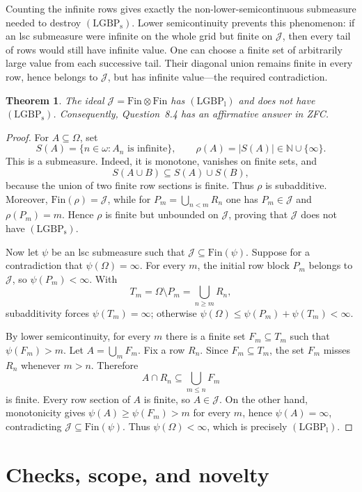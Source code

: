 \documentclass[11pt]{article}
\newtheorem{theorem}{Theorem}
\newcommand{\Fin}{\mathrm{Fin}}
\newcommand{\LGBPs}{\mathrm{(LGBP_s)}}
\newcommand{\LGBPl}{\mathrm{(LGBP_l)}}
\newcommand{\cJ}{\mathcal{J}}
\begin{document}
Counting the infinite rows gives exactly the non-lower-semicontinuous
submeasure needed to destroy \(\LGBPs\).  Lower semicontinuity prevents this
phenomenon: if an lsc submeasure were infinite on the whole grid but finite on
\(\cJ\), then every tail of rows would still have infinite value.  One can
choose a finite set of arbitrarily large value from each successive tail.
Their diagonal union remains finite in every row, hence belongs to \(\cJ\),
but has infinite value---the required contradiction.

\begin{theorem}
The ideal \(\cJ=\Fin\otimes\Fin\) has \(\LGBPl\) and does not have
\(\LGBPs\).  Consequently, Question~8.4 has an affirmative answer in ZFC.
\end{theorem}

\begin{proof}
For \(A\subseteq\Omega\), set
\[
 S(A)=\{n\in\omega:A_n\text{ is infinite}\},\qquad
 \rho(A)=|S(A)|\in\mathbb N\cup\{\infty\}.
\]
This is a submeasure.  Indeed, it is monotone, vanishes on finite sets, and
\[
 S(A\cup B)\subseteq S(A)\cup S(B),
\]
because the union of two finite row sections is finite.  Thus \(\rho\) is
subadditive.  Moreover,
\(\Fin(\rho)=\cJ\), while for
\(P_m=\bigcup_{n<m}R_n\) one has \(P_m\in\cJ\) and \(\rho(P_m)=m\).
Hence \(\rho\) is finite but unbounded on \(\cJ\), proving that \(\cJ\)
does not have \(\LGBPs\).

Now let \(\psi\) be an lsc submeasure such that
\(\cJ\subseteq\Fin(\psi)\).  Suppose for a contradiction that
\(\psi(\Omega)=\infty\).  For every \(m\), the initial row block \(P_m\)
belongs to \(\cJ\), so \(\psi(P_m)<\infty\).  With
\[
 T_m=\Omega\setminus P_m=\bigcup_{n\ge m}R_n,
\]
subadditivity forces \(\psi(T_m)=\infty\); otherwise
\(\psi(\Omega)\le\psi(P_m)+\psi(T_m)<\infty\).

By lower semicontinuity, for every \(m\) there is a finite set
\(F_m\subseteq T_m\) such that \(\psi(F_m)>m\).  Let
\(A=\bigcup_m F_m\).  Fix a row \(R_n\).  Since
\(F_m\subseteq T_m\), the set \(F_m\) misses \(R_n\) whenever \(m>n\).
Therefore
\[
 A\cap R_n\subseteq\bigcup_{m\le n}F_m
\]
is finite.  Every row section of \(A\) is finite, so \(A\in\cJ\).  On the
other hand, monotonicity gives
\(\psi(A)\ge\psi(F_m)>m\) for every \(m\), hence \(\psi(A)=\infty\),
contradicting \(\cJ\subseteq\Fin(\psi)\).  Thus
\(\psi(\Omega)<\infty\), which is precisely \(\LGBPl\).
\end{proof}

\section{Checks, scope, and novelty}
\end{document}
